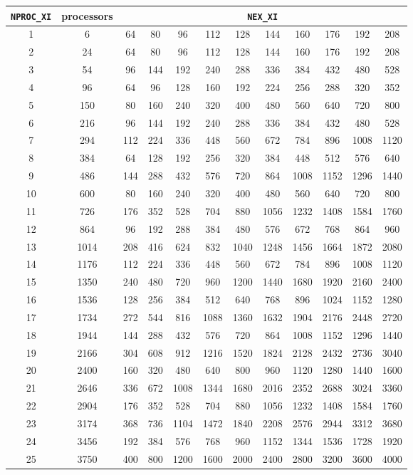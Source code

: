 \documentclass[oneside,english]{book}
\providecommand{\tabularnewline}{\\}
\newcommand{\nexxi}{\mbox{\texttt{NEX\_XI}}}
\newcommand{\nprocxi}{\mbox{\texttt{NPROC\_XI}}}
\begin{document}
\noindent \begin{center}
\label{table:nex} \begin{longtable}{|c|c|c|c|c|c|c|c|c|c|c|c|}
\hline
\nprocxi & processors & \multicolumn{10}{c|}{\nexxi}\tabularnewline
\hline
\endhead
\hline
1 & 6 & 64 & 80 & 96 & 112 & 128 & 144 & 160 & 176 & 192 & 208\tabularnewline
\hline
2 & 24 & 64 & 80 & 96 & 112 & 128 & 144 & 160 & 176 & 192 & 208\tabularnewline
\hline
3 & 54 & 96 & 144 & 192 & 240 & 288 & 336 & 384 & 432 & 480 & 528\tabularnewline
\hline
4 & 96 & 64 & 96 & 128 & 160 & 192 & 224 & 256 & 288 & 320 & 352\tabularnewline
\hline
5 & 150 & 80 & 160 & 240 & 320 & 400 & 480 & 560 & 640 & 720 & 800\tabularnewline
\hline
6 & 216 & 96 & 144 & 192 & 240 & 288 & 336 & 384 & 432 & 480 & 528\tabularnewline
\hline
7 & 294 & 112 & 224 & 336 & 448 & 560 & 672 & 784 & 896 & 1008 & 1120\tabularnewline
\hline
8 & 384 & 64 & 128 & 192 & 256 & 320 & 384 & 448 & 512 & 576 & 640\tabularnewline
\hline
9 & 486 & 144 & 288 & 432 & 576 & 720 & 864 & 1008 & 1152 & 1296 & 1440\tabularnewline
\hline
10 & 600 & 80 & 160 & 240 & 320 & 400 & 480 & 560 & 640 & 720 & 800\tabularnewline
\hline
11 & 726 & 176 & 352 & 528 & 704 & 880 & 1056 & 1232 & 1408 & 1584 & 1760\tabularnewline
\hline
12 & 864 & 96 & 192 & 288 & 384 & 480 & 576 & 672 & 768 & 864 & 960\tabularnewline
\hline
13 & 1014 & 208 & 416 & 624 & 832 & 1040 & 1248 & 1456 & 1664 & 1872 & 2080\tabularnewline
\hline
14 & 1176 & 112 & 224 & 336 & 448 & 560 & 672 & 784 & 896 & 1008 & 1120\tabularnewline
\hline
15 & 1350 & 240 & 480 & 720 & 960 & 1200 & 1440 & 1680 & 1920 & 2160 & 2400\tabularnewline
\hline
16 & 1536 & 128 & 256 & 384 & 512 & 640 & 768 & 896 & 1024 & 1152 & 1280\tabularnewline
\hline
17 & 1734 & 272 & 544 & 816 & 1088 & 1360 & 1632 & 1904 & 2176 & 2448 & 2720\tabularnewline
\hline
18 & 1944 & 144 & 288 & 432 & 576 & 720 & 864 & 1008 & 1152 & 1296 & 1440\tabularnewline
\hline
19 & 2166 & 304 & 608 & 912 & 1216 & 1520 & 1824 & 2128 & 2432 & 2736 & 3040\tabularnewline
\hline
20 & 2400 & 160 & 320 & 480 & 640 & 800 & 960 & 1120 & 1280 & 1440 & 1600\tabularnewline
\hline
21 & 2646 & 336 & 672 & 1008 & 1344 & 1680 & 2016 & 2352 & 2688 & 3024 & 3360\tabularnewline
\hline
22 & 2904 & 176 & 352 & 528 & 704 & 880 & 1056 & 1232 & 1408 & 1584 & 1760\tabularnewline
\hline
23 & 3174 & 368 & 736 & 1104 & 1472 & 1840 & 2208 & 2576 & 2944 & 3312 & 3680\tabularnewline
\hline
24 & 3456 & 192 & 384 & 576 & 768 & 960 & 1152 & 1344 & 1536 & 1728 & 1920\tabularnewline
\hline
25 & 3750 & 400 & 800 & 1200 & 1600 & 2000 & 2400 & 2800 & 3200 & 3600 & 4000\tabularnewline

\end{longtable}
\end{center}
\end{document}

